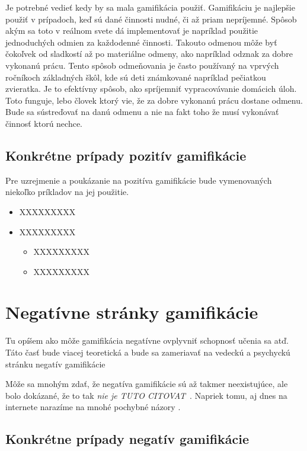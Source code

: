\documentclass[10pt,twoside,slovak,a4paper]{article}
\begin{document}
Je potrebné vedieť kedy by sa mala gamifikácia použiť. Gamifikáciu je najlepšie použiť v prípadoch, keď sú dané činnosti nudné, či až priam nepríjemné. Spôsob akým sa toto v reálnom svete dá implementovať je napríklad použitie jednoduchých odmien za každodenné činnosti. Takouto odmenou môže byť čokoľvek od sladkostí až po materiálne odmeny, ako napríklad odznak za dobre vykonanú prácu. Tento spôsob odmeňovania je často používaný na vprvých ročníkoch základných škôl, kde sú deti známkované napríklad pečiatkou zvieratka. Je to efektívny spôsob, ako spríjemniť vypracovávanie domácich úloh. Toto funguje, lebo človek ktorý vie, že za dobre vykonanú prácu dostane odmenu. Bude sa sústreďovať na danú odmenu a nie na fakt toho že musí vykonávať činnosť ktorú nechce.

\subsection{Konkrétne prípady pozitív gamifikácie} \label{PozitivnaPriklady}
Pre uzrejmenie a poukázanie na pozitíva gamifikácie bude vymenovaných niekoľko príkladov na jej použitie.

\begin{itemize}
\item XXXXXXXXX
\item XXXXXXXXX
	\begin{itemize}
	\item XXXXXXXXX
	\item XXXXXXXXX
	\end{itemize}
\end{itemize}


\section{Negatívne stránky gamifikácie} \label{NegativnaGamifikacia}

Tu opíšem ako môže gamifikácia negatívne ovplyvniť schopnosť učenia sa atď.
Táto časť bude viacej teoretická a bude sa zameriavať na vedeckú a psychyckú stránku negatív gamifikácie

Môže sa mnohým zdať, že negatíva gamifikácie sú až takmer neexistujúce, ale bolo dokázané, že to tak \emph{nie je TUTO CITOVAT}~\cite{Czarnecki:Staged, Czarnecki:Progress}. Napriek tomu, aj dnes na internete narazíme na mnohé pochybné názory \cite{PLP-Framework}.


\subsection{Konkrétne prípady negatív gamifikácie} \label{NegativnePriklady}
\end{document}
